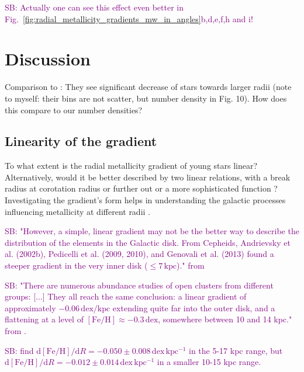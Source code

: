 \documentclass[fleqn,usenatbib]{mnras}
\newcommand{\SB}[1]{{\textcolor{purple}{SB: #1}}}
\begin{document}
\SB{Actually one can see this effect even better in Fig.~\ref{fig:radial_metallicity_gradients_mw_in_angles}b,d,e,f,h and i!}

\section{Discussion} \label{sec:discussion}

Comparison to \citet[][see their Fig. 10]{Minchev2014b}: They see significant decrease of stars towards larger radii (note to myself: their bins are not scatter, but number density in Fig. 10). How does this compare to our number densities?

\subsection{Linearity of the gradient} \label{sec:discussion_linearity}

To what extent is the radial metallicity gradient of young stars linear? Alternatively, would it be better described by two linear relations, with a break radius at corotation radius \citep[][and references therein]{Bresolin2012} or further out \citep{Donor2020} or a more sophisticated function \citep[see e.g.][]{Chiappini2001, Kubryk2015}? Investigating the gradient's form helps in understanding the galactic processes influencing metallicity at different radii \citep{Minchev2014b}.

\SB{"However, a simple, linear gradient may not be the better way to describe the distribution of the elements in the Galactic disk. From Cepheids, Andrievsky et al. (2002b), Pedicelli et al. (2009, 2010), and Genovali et al. (2013) found a steeper gradient in the very inner disk ($\leq 7\,\mathrm{kpc}$)." from \citet{Lemasle2013}}

\SB{"There are numerous abundance studies of open clusters from different groups: [...] They all reach the same conclusion: a linear gradient of approximately $-0.06\,\mathrm{dex/kpc}$ extending quite far into the outer disk, and a flattening at a level of $\mathrm{[Fe/H]} \approx -0.3\,\mathrm{dex}$, somewhere between 10 and 14 kpc." from \citet{Lemasle2013}.}

\SB{\citet{Lemasle2008} find $\mathrm{d[Fe/H]}/\mathrm{d}R = -0.050 \pm 0.008\,\mathrm{dex\,kpc^{-1}}$ in the 5-17 kpc range, but $\mathrm{d[Fe/H]}/\mathrm{d}R = -0.012 \pm 0.014\,\mathrm{dex\,kpc^{-1}}$ in a smaller 10-15 kpc range.}
\end{document}
